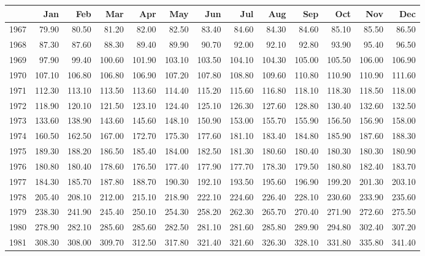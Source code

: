 \begin{longtable}{rrrrrrrrrrrrr}
  \hline
 & Jan & Feb & Mar & Apr & May & Jun & Jul & Aug & Sep & Oct & Nov & Dec \\ 
  \hline
1967 & 79.90 & 80.50 & 81.20 & 82.00 & 82.50 & 83.40 & 84.60 & 84.30 & 84.60 & 85.10 & 85.50 & 86.50 \\ 
  1968 & 87.30 & 87.60 & 88.30 & 89.40 & 89.90 & 90.70 & 92.00 & 92.10 & 92.80 & 93.90 & 95.40 & 96.50 \\ 
  1969 & 97.90 & 99.40 & 100.60 & 101.90 & 103.10 & 103.50 & 104.10 & 104.30 & 105.00 & 105.50 & 106.00 & 106.90 \\ 
  1970 & 107.10 & 106.80 & 106.80 & 106.90 & 107.20 & 107.80 & 108.80 & 109.60 & 110.80 & 110.90 & 110.90 & 111.60 \\ 
  1971 & 112.30 & 113.10 & 113.50 & 113.60 & 114.40 & 115.20 & 115.60 & 116.80 & 118.10 & 118.30 & 118.50 & 118.00 \\ 
  1972 & 118.90 & 120.10 & 121.50 & 123.10 & 124.40 & 125.10 & 126.30 & 127.60 & 128.80 & 130.40 & 132.60 & 132.50 \\ 
  1973 & 133.60 & 138.90 & 143.60 & 145.60 & 148.10 & 150.90 & 153.00 & 155.70 & 155.90 & 156.50 & 156.90 & 158.00 \\ 
  1974 & 160.50 & 162.50 & 167.00 & 172.70 & 175.30 & 177.60 & 181.10 & 183.40 & 184.80 & 185.90 & 187.60 & 188.30 \\ 
  1975 & 189.30 & 188.20 & 186.50 & 185.40 & 184.00 & 182.50 & 181.30 & 180.60 & 180.40 & 180.30 & 180.30 & 180.90 \\ 
  1976 & 180.80 & 180.40 & 178.60 & 176.50 & 177.40 & 177.90 & 177.70 & 178.30 & 179.50 & 180.80 & 182.40 & 183.70 \\ 
  1977 & 184.30 & 185.70 & 187.80 & 188.70 & 190.30 & 192.10 & 193.50 & 195.60 & 196.90 & 199.20 & 201.30 & 203.10 \\ 
  1978 & 205.40 & 208.10 & 212.00 & 215.10 & 218.90 & 222.10 & 224.60 & 226.40 & 228.10 & 230.60 & 233.90 & 235.60 \\ 
  1979 & 238.30 & 241.90 & 245.40 & 250.10 & 254.30 & 258.20 & 262.30 & 265.70 & 270.40 & 271.90 & 272.60 & 275.50 \\ 
  1980 & 278.90 & 282.10 & 285.60 & 285.60 & 282.50 & 281.10 & 281.60 & 285.80 & 289.90 & 294.80 & 302.40 & 307.20 \\ 
  1981 & 308.30 & 308.00 & 309.70 & 312.50 & 317.80 & 321.40 & 321.60 & 326.30 & 328.10 & 331.80 & 335.80 & 341.40 \\ 

\end{longtable}
